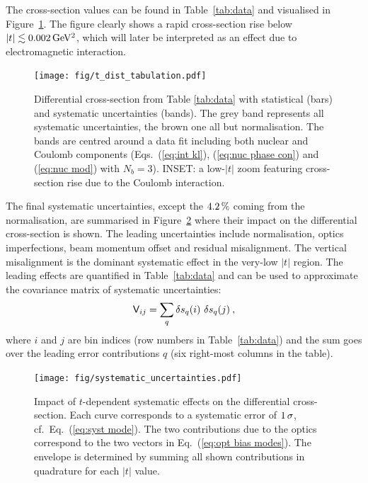 The cross-section values can be found in Table~\ref{tab:data} and visualised in Figure~\ref{fig:dsdt}. The figure clearly shows a rapid cross-section rise below $|t| \lesssim 0.002\,{\rm GeV^2}$, which will later be interpreted as an effect due to electromagnetic interaction.



\begin{figure}
\vskip-5mm
\begin{center}
\texttt{[image: fig/t\_dist\_tabulation.pdf]}
\vskip-3mm
\caption{%
Differential cross-section from Table \ref{tab:data} with statistical (bars) and systematic uncertainties (bands). The grey band represents all systematic uncertainties, the brown one all but normalisation. The bands are centred around a data fit including both nuclear and Coulomb components (Eqs.~(\ref{eq:int kl}), (\ref{eq:nuc phase con}) and (\ref{eq:nuc mod}) with $N_b=3$). INSET: a low-$|t|$ zoom featuring cross-section rise due to the Coulomb interaction.
}
\label{fig:dsdt}
\end{center}
\end{figure}

The final systematic uncertainties, except the $4.2\,{\rm \%}$ coming from the normalisation, are summarised in Figure~\ref{fig:syst unc} where their impact on the differential cross-section is shown. The leading uncertainties include normalisation, optics imperfections, beam momentum offset and residual misalignment. The vertical misalignment is the dominant systematic effect in the very-low $|t|$ region. The leading effects are quantified in Table~\ref{tab:data} and can be used to approximate the covariance matrix of systematic uncertainties:
\begin{equation}
\label{eq:covar mat}
\mathsf{V}_{ij} = \sum_{q} \delta s_{q}(i)\ \delta s_{q}(j)\: ,
\end{equation}
where $i$ and $j$ are bin indices (row numbers in Table~\ref{tab:data}) and the sum goes over the leading error contributions $q$ (six right-most columns in the table).

\begin{figure}
\begin{center}
\texttt{[image: fig/systematic\_uncertainties.pdf]}
\caption{%
Impact of $t$-dependent systematic effects on the differential cross-section. Each curve corresponds to a systematic error of $1\,{\rm \sigma}$, cf.~Eq.~(\ref{eq:syst mode}). The two contributions due to the optics correspond to the two vectors in Eq.~(\ref{eq:opt bias modes}). The envelope is determined by summing all shown contributions in quadrature for each $|t|$ value.
}
\label{fig:syst unc}
\end{center}
\end{figure}

